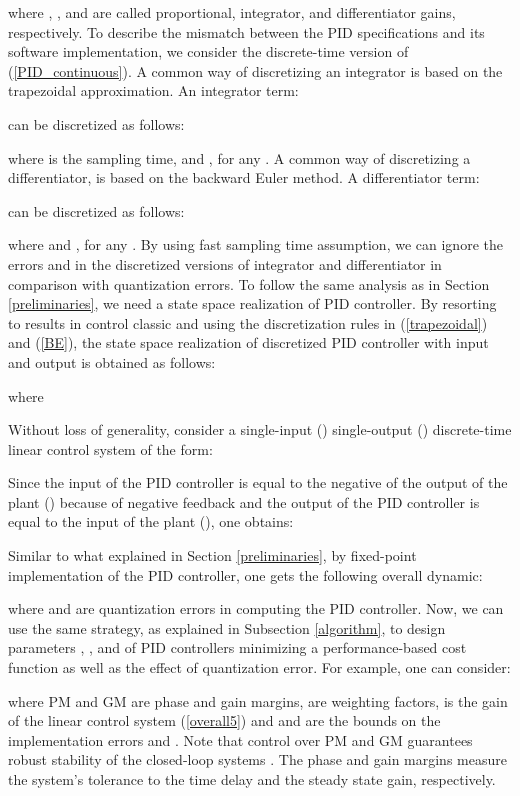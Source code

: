 \documentclass{amsart}
\numberwithin{equation}{section}
\begin{document}
where , , and  are called proportional, integrator, and differentiator gains, respectively. 
To describe the mismatch between the PID specifications and its software implementation, 
we consider the discrete-time version of (\ref{PID_continuous}). 
A common way of discretizing an integrator is based on the trapezoidal approximation. 
An integrator term:
  
can be discretized as follows:
  
where  is the sampling time,  and , for any . A common way of discretizing a differentiator, is based on the backward Euler method. A differentiator term:
  
can be discretized as follows:
  
where  and , for any . By using fast sampling time assumption, we can ignore the errors  and  in the discretized versions of integrator and differentiator in comparison with quantization errors. To follow the same analysis as in Section \ref{preliminaries}, we need a state space realization of PID controller. By resorting to results in control classic \cite{kailath} and using the discretization rules in (\ref{trapezoidal}) and (\ref{BE}), the state space realization of discretized PID controller with input  and output  is obtained as follows:

where

Without loss of generality, consider a single-input () single-output () discrete-time linear control system of the form:

Since the input of the PID controller is equal to the negative of the output of the plant () because of negative feedback and the output of the PID controller is equal to the input of the plant (), one obtains:

Similar to what explained in Section \ref{preliminaries}, by fixed-point implementation of the PID controller, one gets the following overall dynamic:

where  and  are quantization errors in computing the PID controller. Now, we can use the same strategy, as explained in Subsection \ref{algorithm}, to design parameters , , and  of PID controllers minimizing a performance-based cost function as well as the effect of quantization error. For example, one can consider:

where PM and GM are phase and gain margins,  are weighting factors,  is the  gain of the linear control system (\ref{overall5}) and  and  are the bounds on the implementation errors  and . Note that control over PM and GM guarantees robust stability of the closed-loop systems \cite{joao}. The phase and gain margins measure the system's tolerance to the time delay and the steady state gain, respectively.
\end{document}
